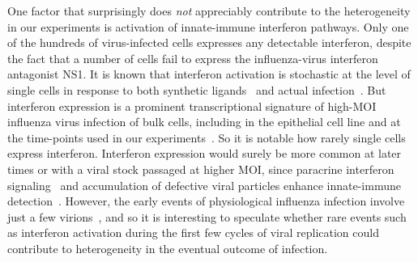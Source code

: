 \documentclass[9pt,lineno]{elife}
\begin{document}
One factor that surprisingly does \emph{not} appreciably contribute to the heterogeneity in our experiments is activation of innate-immune interferon pathways.
Only one of the hundreds of virus-infected cells expresses any detectable interferon, despite the fact that a number of cells fail to express the influenza-virus interferon antagonist NS1.
It is known that interferon activation is stochastic at the level of single cells in response to both synthetic ligands~\citep{shalek2013single,shalek2014single,bhushal2017cell,hagai2017gene} and actual infection~\citep{Rand:2012kl,PerezCidoncha:2014jr,avraham2015pathogen,Killip:2017ef}.
But interferon expression is a prominent transcriptional signature of high-MOI influenza virus infection of bulk cells, including in the epithelial cell line and at the time-points used in our experiments~\citep{Geiss:2002a,sutejo2012activation}.
So it is notable how rarely single cells express interferon.
Interferon expression would surely be more common at later times or with a viral stock passaged at higher MOI, since paracrine interferon signaling~\citep{crotta2013type} and accumulation of defective viral particles enhance innate-immune detection~\citep{Tapia:2013kf,Lopez:2014en}.
However, the early events of physiological influenza infection involve just a few virions~\citep{varble2014influenza,mccrone2017evolutionary}, and so it is interesting to speculate whether rare events such as interferon activation during the first few cycles of viral replication could contribute to heterogeneity in the eventual outcome of infection.
\end{document}
